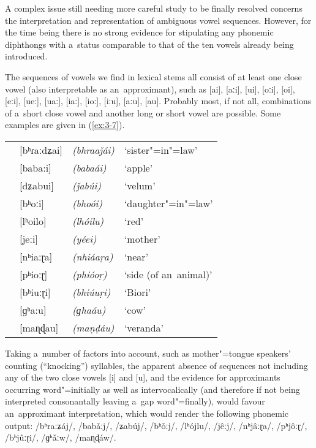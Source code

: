 A complex issue still needing more careful study to be finally resolved concerns the interpretation and representation of ambiguous vowel sequences. However, for the time being there is no strong evidence for stipulating any phonemic diphthongs with a~status comparable to that of the ten vowels already being introduced.

The sequences of vowels we find in lexical stems all consist of at least one close vowel (also interpretable as an~approximant), such as [ai], [aːi], [ui], [oːi], [oi], [eːi], [ueː], [uaː], [iaː], [ioː], [iːu], [aːu], [au]. Probably most, if not all, combinations of a~short close vowel and another long or short vowel are possible. Some examples are given in (\ref{ex:3-7}).


\begin{exe}
\extab
\label{ex:3-7}
\begin{tabularx}{\textwidth}{ l l l l }
&
[bʰɾaːdʑai] &
\textit{(bhraaǰái)} &
`sister"=in"=law'\\
&
[baba:i] &
\textit{(babaái)} &
`apple'\\
&
[dʑabui] &
\textit{(ǰabúi)} &
`velum'\\
&
[bʰoːi] &
\textit{(bhoói)} &
`daughter"=in"=law'\\
&
[lʰoilo] &
\textit{(lhóilu)} &
`red'\\
&
[jeːi] &
\textit{(yéei)} &
`mother'\\
&
[nʰiaːɽa] &
\textit{(nhiáaṛa)} &
`near'\\
&
[pʰioːɽ] &
\textit{(phióoṛ)} &
`side (of an~animal)' \\
&
[bʰiuːɽi] &
\textit{(bhiúuṛi)} &
`Biori'\\
&
[ɡʰa:u] &
\textit{(ɡhaáu)} &
`cow'\\
&
[maɳɖau] &
\textit{(maṇḍáu)} &
`veranda'\\
\end{tabularx}
\end{exe}


Taking a~number of factors into account, such as mother"=tongue speakers' counting (``knocking'') syllables, the apparent absence of sequences not including any of the two close vowels [i] and [u], and the evidence for approximants occurring word"=initially as well as intervocalically (and therefore if not being interpreted consonantally leaving a~gap word"=finally), would favour an~approximant interpretation, which would render the following phonemic output: /bʰraːʑáj/, /babǎːj/, /ʑabúj/, /bʰ\v{o}ːj/, /lʰójlu/, /jêːj/, /nʰjâːɽa/, /pʰjôːɽ/, /bʰjûːɽi/, /ɡʰǎːw/, /maɳɖáw/.


